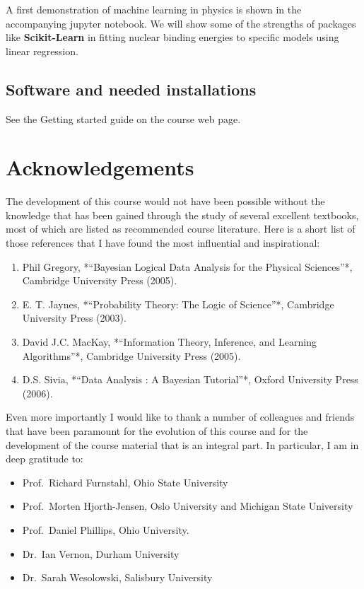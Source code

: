 \documentclass[%
oneside,                 %
final,                   %
10pt]{article}
\begin{document}
A first demonstration of machine learning in physics is shown in the accompanying jupyter notebook. We will show some of the strengths of packages like \textbf{Scikit-Learn} in fitting nuclear binding energies to specific models using linear regression.

\subsection{Software and needed installations}

See the Getting started guide on the course web page.

\section{Acknowledgements}

The development of this course would not have been possible without the knowledge that has been gained through the study of several excellent textbooks, most of which are listed as recommended course literature. Here is a short list of those references that I have found the most influential and inspirational:

\begin{enumerate}
\item Phil Gregory, *``Bayesian Logical Data Analysis for the Physical Sciences''*, Cambridge University Press (2005).

\item E. T. Jaynes, *``Probability Theory: The Logic of Science''*, Cambridge University Press (2003).

\item David J.C. MacKay, *``Information Theory, Inference, and Learning Algorithms''*, Cambridge University Press (2005).

\item D.S. Sivia, *``Data Analysis : A Bayesian Tutorial''*, Oxford University Press (2006).
\end{enumerate}

\noindent
Even more importantly I would like to thank a number of colleagues and friends that have been paramount for the evolution of this course and for the
development of the course material that is an integral part. In particular, I am in deep gratitude to:

\begin{itemize}
\item Prof.~Richard Furnstahl, Ohio State University

\item Prof.~Morten Hjorth-Jensen, Oslo University and Michigan State University

\item Prof.~Daniel Phillips, Ohio University.

\item Dr.~Ian Vernon, Durham University

\item Dr.~Sarah Wesolowski, Salisbury University
\end{itemize}
\end{document}
